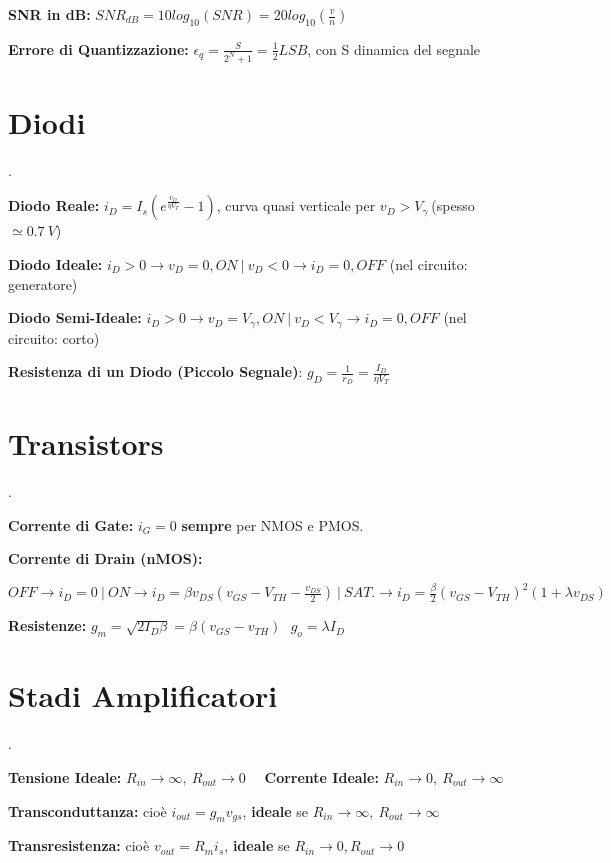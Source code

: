 \documentclass[12pt]{extarticle}
\begin{document}
{\bf SNR in dB:} $\displaystyle SNR_{dB} = 10log_{10}(SNR) = 20log_{10}(\frac{v}{n})$

{\bf Errore di Quantizzazione:} $\displaystyle \epsilon_q = \frac{S}{2^N+1} = \frac{1}{2}LSB $, con S dinamica del segnale

\section{Diodi}.

{\bf Diodo Reale:} $\displaystyle i_D = I_s(e^{\frac{v_D}{\eta V_T}}- 1)$, curva quasi verticale per $ v_D > V_\gamma \ $(spesso $\simeq 0.7 \ V $)$ $

{\bf Diodo Ideale:} $i_D > 0 \to v_D = 0, ON \ \big | \ v_D < 0 \to i_D = 0, OFF $ (nel circuito: generatore)

{\bf Diodo Semi-Ideale:} $i_D > 0 \to v_D = V_\gamma, ON \ \big | \ v_D < V_\gamma \to i_D = 0, OFF$ (nel circuito: corto)

{\bf Resistenza di un Diodo (Piccolo Segnale)}: $\displaystyle g_D = \frac{1}{r_D} = \frac{I_D}{\eta V_T}$

\section{Transistors}.

{\bf Corrente di Gate:} $i_G = 0$ {\bf sempre} per NMOS e PMOS.

{\bf Corrente di Drain (nMOS):} 

$\displaystyle OFF \to i_D = 0 \ \big | \  ON \to i_D = \beta v_{DS}(v_{GS}-V_{TH}-\frac{v_{DS}}{2}) \ \big | \ SAT. \to i_D = \frac{\beta}{2}(v_{GS}-V_{TH})^2(1+\lambda v_{DS})$

{\bf Resistenze:} $\displaystyle g_m = \sqrt{2I_D\beta} = \beta(v_{GS}-v_{TH})\ \ \ g_o = \lambda I_D$

\section{Stadi Amplificatori}.

{\bf Tensione Ideale:} $R_{in} \to \infty, \ R_{out} \to 0 $ \ \ {\bf Corrente Ideale:} $R_{in} \to 0, \ R_{out} \to \infty $ 

{\bf Transconduttanza:} cioè $ i_{out} = g_mv_{gs} $, {\bf ideale} se $R_{in} \to \infty, \ R_{out} \to \infty$

{\bf Transresistenza:} cioè $ v_{out} = R_mi_s$, {\bf ideale} se $R_{in} \to 0, R_{out} \to 0$ 
\end{document}
